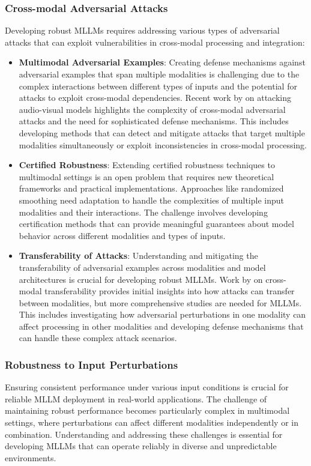 \subsubsection{Cross-modal Adversarial Attacks}
Developing robust MLLMs requires addressing various types of adversarial attacks that can exploit vulnerabilities in cross-modal processing and integration:

\begin{itemize}
    \item \textbf{Multimodal Adversarial Examples}: Creating defense mechanisms against adversarial examples that span multiple modalities is challenging due to the complex interactions between different types of inputs and the potential for attacks to exploit cross-modal dependencies. Recent work by \citet{xu2018fooling} on attacking audio-visual models highlights the complexity of cross-modal adversarial attacks and the need for sophisticated defense mechanisms. This includes developing methods that can detect and mitigate attacks that target multiple modalities simultaneously or exploit inconsistencies in cross-modal processing.
    
    \item \textbf{Certified Robustness}: Extending certified robustness techniques to multimodal settings is an open problem that requires new theoretical frameworks and practical implementations. Approaches like randomized smoothing \citep{cohen2019certified} need adaptation to handle the complexities of multiple input modalities and their interactions. The challenge involves developing certification methods that can provide meaningful guarantees about model behavior across different modalities and types of inputs.
    
    \item \textbf{Transferability of Attacks}: Understanding and mitigating the transferability of adversarial examples across modalities and model architectures is crucial for developing robust MLLMs. Work by \citet{naseer2019cross} on cross-modal transferability provides initial insights into how attacks can transfer between modalities, but more comprehensive studies are needed for MLLMs. This includes investigating how adversarial perturbations in one modality can affect processing in other modalities and developing defense mechanisms that can handle these complex attack scenarios.
\end{itemize}

\subsubsection{Robustness to Input Perturbations}
Ensuring consistent performance under various input conditions is crucial for reliable MLLM deployment in real-world applications. The challenge of maintaining robust performance becomes particularly complex in multimodal settings, where perturbations can affect different modalities independently or in combination. Understanding and addressing these challenges is essential for developing MLLMs that can operate reliably in diverse and unpredictable environments.

